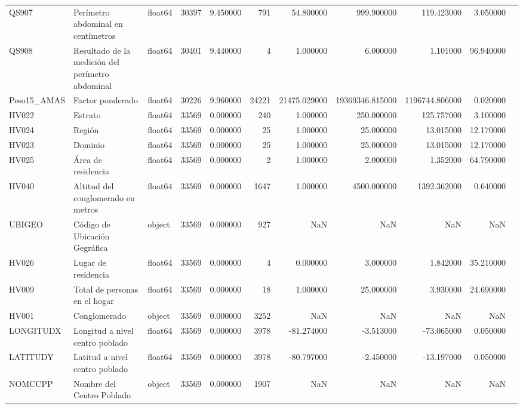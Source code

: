 \begin{longtable}{lllrrrrrrrl}
QS907 & Perímetro abdominal en centímetros & float64 & 30397 & 9.450000 & 791 & 54.800000 & 999.900000 & 119.423000 & 3.050000 &  \\
QS908 & Resultado de la medición del perímetro abdominal & float64 & 30401 & 9.440000 & 4 & 1.000000 & 6.000000 & 1.101000 & 96.940000 &  \\
Peso15\_AMAS & Factor ponderado & float64 & 30226 & 9.960000 & 24221 & 21475.029000 & 19369346.815000 & 1196744.806000 & 0.020000 &  \\
HV022 & Estrato & float64 & 33569 & 0.000000 & 240 & 1.000000 & 250.000000 & 125.757000 & 3.100000 &  \\
HV024 & Región & float64 & 33569 & 0.000000 & 25 & 1.000000 & 25.000000 & 13.015000 & 12.170000 &  \\
HV023 & Dominio & float64 & 33569 & 0.000000 & 25 & 1.000000 & 25.000000 & 13.015000 & 12.170000 &  \\
HV025 & Área de residencia & float64 & 33569 & 0.000000 & 2 & 1.000000 & 2.000000 & 1.352000 & 64.790000 &  \\
HV040 & Altitud del conglomerado en metros & float64 & 33569 & 0.000000 & 1647 & 1.000000 & 4500.000000 & 1392.362000 & 0.640000 &  \\
UBIGEO & Código de Ubicación Gegráfica & object & 33569 & 0.000000 & 927 & NaN & NaN & NaN & NaN &  \\
HV026 & Lugar de residencia & float64 & 33569 & 0.000000 & 4 & 0.000000 & 3.000000 & 1.842000 & 35.210000 &  \\
HV009 & Total de personas en el hogar & float64 & 33569 & 0.000000 & 18 & 1.000000 & 25.000000 & 3.930000 & 24.690000 &  \\
HV001 & Conglomerado & object & 33569 & 0.000000 & 3252 & NaN & NaN & NaN & NaN &  \\
LONGITUDX & Longitud a nivel centro poblado & float64 & 33569 & 0.000000 & 3978 & -81.274000 & -3.513000 & -73.065000 & 0.050000 &  \\
LATITUDY & Latitud  a nivel centro poblado & float64 & 33569 & 0.000000 & 3978 & -80.797000 & -2.450000 & -13.197000 & 0.050000 &  \\
NOMCCPP & Nombre del Centro Poblado & object & 33569 & 0.000000 & 1907 & NaN & NaN & NaN & NaN &  \\
\end{longtable}
